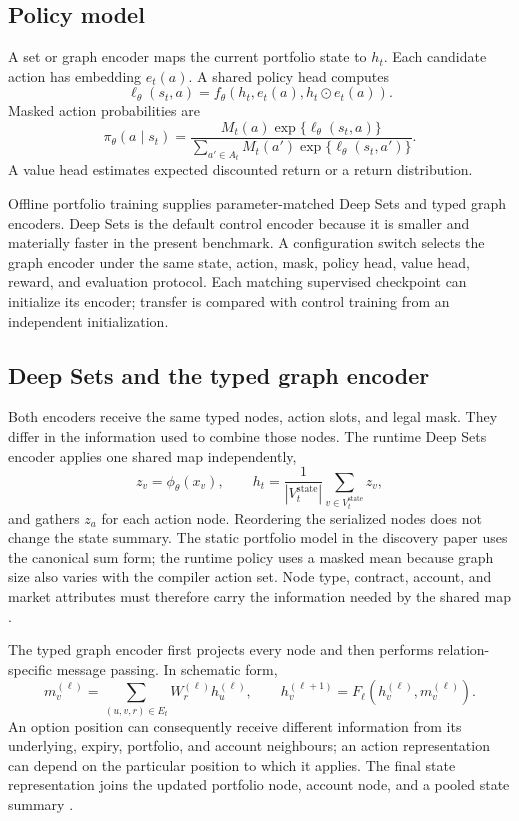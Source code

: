 \documentclass{strategynet-journal}
\begin{document}
\subsection{Policy model}

A set or graph encoder maps the current portfolio state to \(h_t\).  Each
candidate action has embedding \(e_t(a)\).  A shared policy head computes
\[
  \ell_\theta(s_t,a)
  =f_\theta\!\left(h_t,e_t(a),h_t\odot e_t(a)\right).
\]
Masked action probabilities are
\[
  \pi_\theta(a\mid s_t)
  =\frac{M_t(a)\exp\{\ell_\theta(s_t,a)\}}
  {\sum_{a'\in A_t}M_t(a')\exp\{\ell_\theta(s_t,a')\}}.
\]
A value head estimates expected discounted return or a return distribution.

Offline portfolio training supplies parameter-matched Deep Sets and typed
graph encoders.  Deep Sets is the default control encoder because it is
smaller and materially faster in the present benchmark.  A configuration
switch selects the graph encoder under the same state, action, mask, policy
head, value head, reward, and evaluation protocol.  Each matching supervised
checkpoint can initialize its encoder; transfer is compared with control
training from an independent initialization.

\subsection{Deep Sets and the typed graph encoder}
\label{sec:set-versus-graph}

Both encoders receive the same typed nodes, action slots, and legal mask.
They differ in the information used to combine those nodes.  The runtime
Deep Sets encoder applies one shared map independently,
\[
  z_v=\phi_\theta(x_v),
  \qquad
  h_t=\frac{1}{|V_t^{\mathrm{state}}|}
      \sum_{v\in V_t^{\mathrm{state}}}z_v,
\]
and gathers \(z_a\) for each action node.  Reordering the serialized nodes
does not change the state summary.  The static portfolio model in the
discovery paper uses the canonical sum form; the runtime policy uses a masked
mean because graph size also varies with the compiler action set.  Node type,
contract, account, and market attributes must therefore carry the information
needed by the shared map \cite{deepsets}.

The typed graph encoder first projects every node and then performs
relation-specific message passing.  In schematic form,
\[
  m_v^{(\ell)}
  =\sum_{(u,v,r)\in E_t}
    W_r^{(\ell)}h_u^{(\ell)},\qquad
  h_v^{(\ell+1)}
  =F_\ell\!\left(h_v^{(\ell)},m_v^{(\ell)}\right).
\]
An option position can consequently receive different information from its
underlying, expiry, portfolio, and account neighbours; an action
representation can depend on the particular position to which it applies.
The final state representation joins the updated portfolio node, account
node, and a pooled state summary \cite{relational}.
\end{document}
